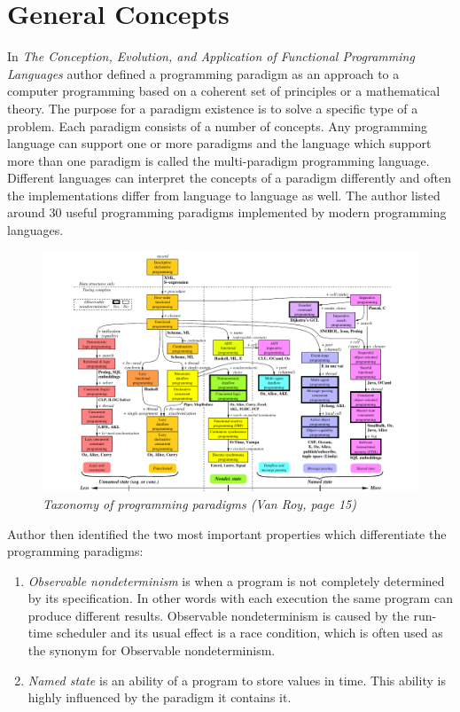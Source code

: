 \documentclass[12pt,twoside,a4paper]{report}
\begin{document}
\section{General Concepts}\label{2.2}
In \emph{The Conception, Evolution, and Application of Functional Programming Languages}\cite{12} author defined a programming paradigm as an approach to a computer programming based on a coherent set of principles or a mathematical theory. The purpose for a paradigm existence is to solve a specific type of a problem. Each paradigm consists of a number of concepts. Any programming language can support one or more paradigms and the language which support more than one paradigm is called the multi-paradigm programming language. Different languages can interpret the concepts of a paradigm differently and often the implementations differ from language to language as well. The author listed around 30 useful programming paradigms implemented by modern programming languages.
\begin{figure}[!hb]
	\centering
		\includegraphics[width=1\textwidth,totalheight=12cm]{taxonomyDiagram}
	\caption{\textit{Taxonomy of programming paradigms (Van Roy, page 15)}}
	\label{f2.1}
\end{figure}
Author then identified the two most important properties which differentiate the programming paradigms:
\begin{enumerate}
\item \textit{Observable nondeterminism} is when a program is not completely determined by its specification. In other words with each execution the same program can produce different results. Observable nondeterminism is caused by the run-time scheduler and its usual effect is a race condition, which is often used as the synonym for Observable nondeterminism.
\item \textit{Named state} is an ability of a program to store values in time. This ability is highly influenced by the paradigm it contains it.
\end{enumerate}
\end{document}
